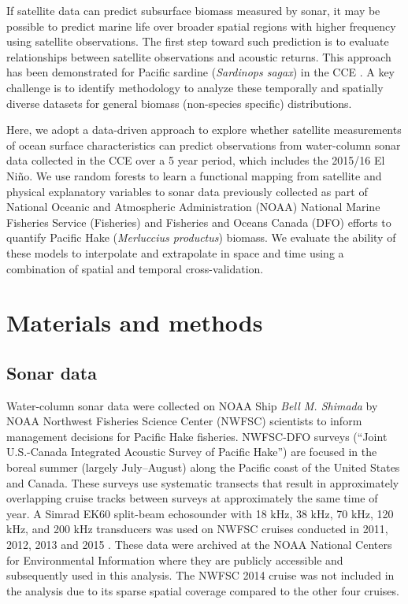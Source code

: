 \documentclass[10pt,letterpaper]{article}
\begin{document}
If satellite data can predict subsurface biomass measured by sonar, it may be possible to predict marine life over broader spatial regions with higher frequency using satellite observations.
The first step toward such prediction is to evaluate relationships between satellite observations and acoustic returns.
This approach has been demonstrated for Pacific sardine (\emph{Sardinops sagax}) in the CCE \cite{zwolinski2011predicting}.
A key challenge is to identify methodology to analyze these temporally and spatially diverse datasets for general biomass (non-species specific) distributions.

Here, we adopt a data-driven approach to explore whether satellite measurements of ocean surface characteristics can predict observations from water-column sonar data collected in the CCE over a 5 year period, which includes the 2015/16 El Ni{\~{n}}o.
We use random forests to learn a functional mapping from satellite and physical explanatory variables to sonar data previously collected as part of National Oceanic and Atmospheric Administration (NOAA) National Marine Fisheries Service (Fisheries) and Fisheries and Oceans Canada (DFO) efforts to quantify Pacific Hake (\emph{Merluccius productus}) biomass.
We evaluate the ability of these models to interpolate and extrapolate in space and time using a combination of spatial and temporal cross-validation.

\section*{Materials and methods}

\subsection*{Sonar data}
Water-column sonar data were collected on NOAA Ship \emph{Bell M. Shimada} by NOAA Northwest Fisheries Science Center (NWFSC) scientists to inform management decisions for Pacific Hake fisheries.
NWFSC-DFO surveys (``Joint U.S.-Canada Integrated Acoustic Survey of Pacific Hake”) are focused in the boreal summer (largely July–August) along the Pacific coast of the United States and Canada.
These surveys use systematic transects that result in approximately overlapping cruise tracks between surveys at approximately the same time of year.
A Simrad EK60 split-beam echosounder with 18 kHz, 38 kHz, 70 kHz, 120 kHz, and 200 kHz transducers was used on NWFSC cruises conducted in 2011, 2012, 2013 and 2015 \cite{nwfsc2011sonar, nwfsc2012sonar, nwfsc2013sonar, nwfsc2015sonar}.
These data were archived at the NOAA National Centers for Environmental Information where they are publicly accessible and subsequently used in this analysis.
The NWFSC 2014 cruise was not included in the analysis due to its sparse spatial coverage compared to the other four cruises.
\end{document}
